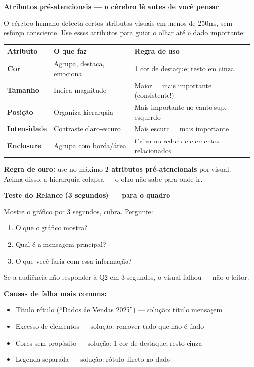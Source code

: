\begin{SolvedBox}
\textbf{Atributos pré-atencionais — o cérebro lê antes de você pensar}

O cérebro humano detecta certos atributos visuais em menos de 250ms, sem esforço consciente.
Use esses atributos para guiar o olhar até o dado importante:

\begin{tabular}{|l|p{4.5cm}|p{5.5cm}|}
\hline
\textbf{Atributo} & \textbf{O que faz} & \textbf{Regra de uso} \\
\hline
\textbf{Cor} & Agrupa, destaca, emociona & 1 cor de destaque; resto em cinza \\
\textbf{Tamanho} & Indica magnitude & Maior = mais importante (consistente!) \\
\textbf{Posição} & Organiza hierarquia & Mais importante no canto sup. esquerdo \\
\textbf{Intensidade} & Contraste claro-escuro & Mais escuro = mais importante \\
\textbf{Enclosure} & Agrupa com borda/área & Caixa ao redor de elementos relacionados \\
\hline
\end{tabular}

\textbf{Regra de ouro:} use no máximo \textbf{2 atributos pré-atencionais} por visual.
Acima disso, a hierarquia colapsa — o olho não sabe para onde ir.
\end{SolvedBox}

\begin{BoardBox}
\textbf{Teste do Relance (3 segundos) — para o quadro}

Mostre o gráfico por 3 segundos, cubra. Pergunte:
\begin{enumerate}
  \item O que o gráfico mostra?
  \item Qual é a mensagem principal?
  \item O que você faria com essa informação?
\end{enumerate}

Se a audiência não responder à Q2 em 3 segundos, o visual falhou — não o leitor.

\textbf{Causas de falha mais comuns:}
\begin{itemize}
  \item Título rótulo (``Dados de Vendas 2025'') — solução: título mensagem
  \item Excesso de elementos — solução: remover tudo que não é dado
  \item Cores sem propósito — solução: 1 cor de destaque, resto cinza
  \item Legenda separada — solução: rótulo direto no dado
\end{itemize}
\end{BoardBox}

